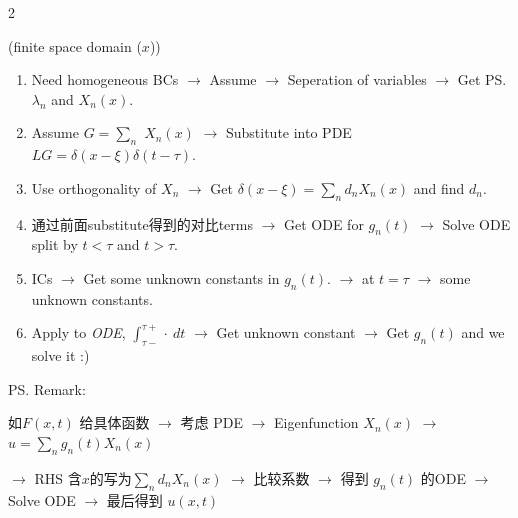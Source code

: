 \documentclass{note}
\begin{document}
\begin{multicols}{2}
{{\begin{MyTh}{}
        \quad {} (finite space domain ($x$))
        
        \vspace{-2pt}
        \begin{enumerate}
            \item Need homogeneous BCs $\to$ Assume  $\to$ Seperation of variables $\to$ Get \ps{$\lambda_n$ and $X_n(x)$.}
            \vspace{-2pt}
            \item Assume $G = \sum_n$  $X_n(x)$ $\to$ Substitute into PDE $L G=\delta(x-\xi)\delta(t-\tau)$.
            \vspace{-2pt}
            \item Use orthogonality of $X_n$ $\to$ Get $\delta(x-\xi) = \sum_n d_n X_n(x)$ and find $d_n$.
            \vspace{-2pt}
            \item 通过前面substitute得到的对比terms $\to$ Get ODE for $g_n(t)$ $\to$ Solve ODE split by $t<\tau$ and $t>\tau$.
            \vspace{-2pt}
            \item ICs $\to$ Get some unknown constants in $g_n(t)$. $\to$  at $t=\tau$ $\to$ some unknown constants.
            \vspace{-2pt}
            \item Apply  to \textit{ODE}, $\int_{\tau-}^{\tau+} \cdot \ dt$ $\to$ Get unknown constant $\to$ Get $g_n(t)$ and we solve it :)
        \end{enumerate}

        \qquad \ps{Remark}: 

        \qquad {}

        \quad {}
    \end{MyTh}

    \begin{MyTh}{} \tiny
        如$F(x,t)$ 给具体函数 $\to$ 考虑 PDE $\to$ Eigenfunction $X_n(x)$ $\to$ $u=\sum_n g_n(t)X_n(x)$
        
        \quad $\to$ RHS 含$x$的写为$\sum_n d_n X_n(x)$ $\to$ 比较系数 $\to$ 得到 $g_n(t)$ 的ODE $\to$ Solve ODE $\to$ 最后得到 $u(x,t)$


\end{MyTh}}}
\end{multicols}
\end{document}
